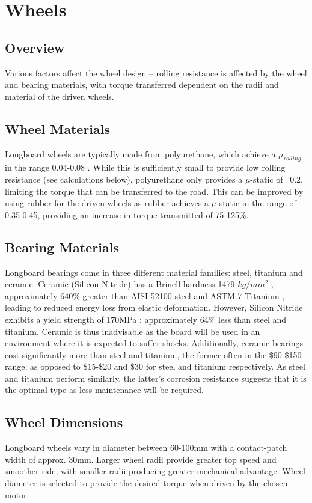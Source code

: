 \documentclass[journal,10pt]{IEEEtran}
\begin{document}
\section{Wheels}
    \subsection{Overview}
        Various factors affect the wheel design – rolling resistance is affected by the wheel and bearing materials, with torque transferred dependent on the radii and material of the driven wheels.
    \subsection{Wheel Materials}
        Longboard wheels are typically made from polyurethane, which achieve a $\mu_{rolling}$ in the range 0.04-0.08 \cite{wheel_data}. While this is sufficiently small to provide low rolling resistance (see calculations below), polyurethane only provides a $\mu$-static of ~0.2, limiting the torque that can be transferred to the road. This can be improved by using rubber for the driven wheels as rubber achieves a $\mu$-static in the range of 0.35-0.45, providing an increase in torque transmitted of 75-125\%.
    \subsection{Bearing Materials}
        Longboard bearings come in three different material families: steel, titanium and ceramic. Ceramic (Silicon Nitride) has a Brinell hardness 1479 $kg/mm^{2}$ \cite{ceramic_data1}, approximately 640\% greater than AISI-52100 steel \cite{steel_data} and ASTM-7 Titanium \cite{titanium_data}, leading to reduced energy loss from elastic deformation.  However, Silicon Nitride exhibits a yield strength of 170MPa \cite{ceramic_data2}: approximately 64\% less than steel and titanium. Ceramic is thus inadvisable as the board will be used in an environment where it is expected to suffer shocks. Additionally, ceramic bearings cost significantly more than steel and titanium, the former often in the \$90-\$150 range, as opposed to \$15-\$20 and \$30 for steel and titanium respectively. As steel and titanium perform similarly, the latter’s corrosion resistance suggests that it is the optimal type as less maintenance will be required. 
    \subsection{Wheel Dimensions}
        Longboard wheels vary in diameter between 60-100mm with a contact-patch width of approx. 30mm. Larger wheel radii provide greater top speed and smoother ride, with smaller radii producing greater mechanical advantage. 
        Wheel diameter is selected to provide the desired torque when driven by the chosen motor.
\end{document}
